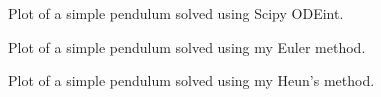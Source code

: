 \documentclass[twocolumn,11pt]{article}
\begin{document}
\begin{figure}[!h]
	\centering
	\noindent
      \caption{Plot of a simple pendulum solved using Scipy ODEint.}
\end{figure}

\begin{figure}[!h]
	\centering
	\noindent
      \caption{Plot of a simple pendulum solved using my Euler method.}
\end{figure}

\begin{figure}[!h]
	\centering
	\noindent
      \caption{Plot of a simple pendulum solved using my Heun's method.}
\end{figure}
\end{document}
